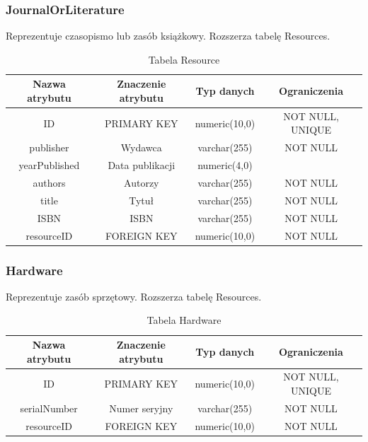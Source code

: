 \subsubsection{JournalOrLiterature}
Reprezentuje czasopismo lub zasób książkowy. Rozszerza tabelę Resources.
\begin{table}[H]
	\renewcommand\arraystretch{1.5}
	\renewcommand\tabcolsep{3pt}
	\begin{tabular}{| c | c | c | c |} 
		\hline \textbf{Nazwa atrybutu} & \textbf{Znaczenie atrybutu} & \textbf{Typ danych} & \textbf{Ograniczenia} \\ 
		\hline ID & PRIMARY KEY & numeric(10,0) & NOT NULL, UNIQUE \\ 
		\hline publisher & Wydawca & varchar(255) & NOT NULL \\ 
		\hline yearPublished & Data publikacji & numeric(4,0) & \\
		\hline authors & Autorzy & varchar(255) & NOT NULL \\
		\hline title & Tytuł & varchar(255) & NOT NULL \\ 
		\hline ISBN & ISBN & varchar(255) & NOT NULL \\ 
		\hline resourceID & FOREIGN KEY & numeric(10,0) & NOT NULL \\ 
		\hline 
	\end{tabular} 
	\caption{Tabela Resource}
	\label{TAB:Resource}
\end{table}

\subsubsection{Hardware}
Reprezentuje zasób sprzętowy. Rozszerza tabelę Resources.
\begin{table}[H]
	\renewcommand\arraystretch{1.5}
	\renewcommand\tabcolsep{3pt}
	\begin{tabular}{| c | c | c | c |} 
		\hline \textbf{Nazwa atrybutu} & \textbf{Znaczenie atrybutu} & \textbf{Typ danych} & \textbf{Ograniczenia} \\ 
		\hline ID & PRIMARY KEY & numeric(10,0) & NOT NULL, UNIQUE \\ 
		\hline serialNumber & Numer seryjny & varchar(255) & NOT NULL \\ 
		\hline resourceID & FOREIGN KEY & numeric(10,0) & NOT NULL \\ 
		\hline 
	\end{tabular} 
	\caption{Tabela Hardware}
	\label{TAB:Hardware}
\end{table}

